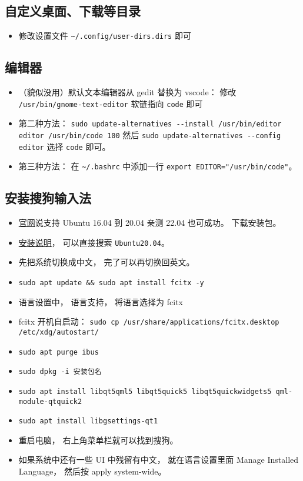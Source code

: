 \subsection{自定义桌面、下载等目录}
\begin{itemize}
\item 修改设置文件 \verb`~/.config/user-dirs.dirs` 即可
\end{itemize}

\subsection{编辑器}
\begin{itemize}
\item （貌似没用）默认文本编辑器从 gedit 替换为 vscode： 修改 \verb`/usr/bin/gnome-text-editor` 软链指向 \verb`code` 即可
\item 第二种方法： \verb`sudo update-alternatives --install /usr/bin/editor editor /usr/bin/code 100` 然后 \verb`sudo update-alternatives --config editor` 选择 \verb`code` 即可。
\item 第三种方法： 在 \verb`~/.bashrc` 中添加一行 \verb`export EDITOR="/usr/bin/code"`。
\end{itemize}

\subsection{安装搜狗输入法}
\begin{itemize}
\item \href{https://shurufa.sogou.com/linux}{官网}说支持 Ubuntu 16.04 到 20.04 亲测 22.04 也可成功。 下载安装包。
\item \href{https://shurufa.sogou.com/linux/guide}{安装说明}， 可以直接搜索 \verb`Ubuntu20.04`。
\item 先把系统切换成中文， 完了可以再切换回英文。
\item \verb`sudo apt update && sudo apt install fcitx -y`
\item 语言设置中， 语言支持， 将语言选择为 fcitx
\item fcitx 开机自启动： \verb`sudo cp /usr/share/applications/fcitx.desktop /etc/xdg/autostart/`
\item \verb`sudo apt purge ibus`
\item \verb`sudo dpkg -i 安装包名`
\item \verb`sudo apt install libqt5qml5 libqt5quick5 libqt5quickwidgets5 qml-module-qtquick2`
\item \verb`sudo apt install libgsettings-qt1`
\item 重启电脑， 右上角菜单栏就可以找到搜狗。
\item 如果系统中还有一些 UI 中残留有中文， 就在语言设置里面 Manage Installed Language， 然后按 apply system-wide。
\end{itemize}

